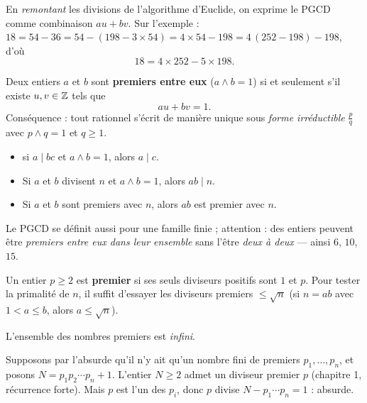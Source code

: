 \begin{savoirfaire}
En \emph{remontant} les divisions de l'algorithme d'Euclide, on exprime le
PGCD comme combinaison $au+bv$. Sur l'exemple :
$18=54-36=54-(198-3\times54)=4\times54-198
=4\,(252-198)-198$, d'où
\[
  18=4\times252-5\times198.
\]
\end{savoirfaire}


\begin{theoreme}[Bézout]
Deux entiers $a$ et $b$ sont \textbf{premiers entre eux} ($a\wedge b=1$) si
et seulement s'il existe $u,v\in\mathbb{Z}$ tels que
\[
  au+bv=1.
\]
Conséquence : tout rationnel s'écrit de manière unique sous \emph{forme
irréductible} $\frac{p}{q}$ avec $p\wedge q=1$ et $q\geq1$.
\end{theoreme}

\begin{theoreme}
\begin{itemize}[label={\color{otNavy}\textbullet},leftmargin=1.4em,itemsep=0.6mm,topsep=0.8mm]
  \item {} si $a\mid bc$ et $a\wedge b=1$, alors $a\mid c$.
  \item Si $a$ et $b$ divisent $n$ et $a\wedge b=1$, alors $ab\mid n$.
  \item Si $a$ et $b$ sont premiers avec $n$, alors $ab$ est premier avec $n$.
\end{itemize}
Le PGCD se définit aussi pour une famille finie ; attention : des entiers
peuvent être \emph{premiers entre eux dans leur ensemble} sans l'être
\emph{deux à deux} — ainsi $6$, $10$, $15$.
\end{theoreme}


\begin{definition}
Un entier $p\geq2$ est \textbf{premier} si ses seuls diviseurs positifs sont
$1$ et $p$. Pour tester la primalité de $n$, il suffit d'essayer les
diviseurs premiers $\leq\sqrt n$ (si $n=ab$ avec $1<a\leq b$, alors
$a\leq\sqrt n$).
\end{definition}

\begin{theoreme}[Euclide]
L'ensemble des nombres premiers est \emph{infini}.
\end{theoreme}

\begin{demonstration}[à connaître]
Supposons par l'absurde qu'il n'y ait qu'un nombre fini de premiers
$p_1,\dots,p_n$, et posons $N=p_1p_2\cdots p_n+1$. L'entier $N\geq2$ admet
un diviseur premier $p$ (chapitre 1, récurrence forte). Mais $p$ est l'un
des $p_i$, donc $p$ divise $N-p_1\cdots p_n=1$ : absurde.
\end{demonstration}

